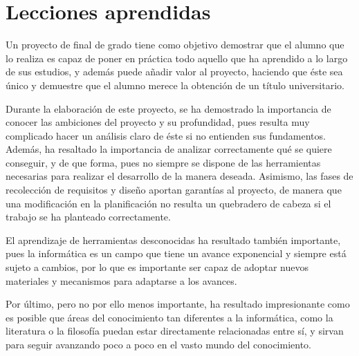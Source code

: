 
\section{Lecciones aprendidas}
Un proyecto de final de grado tiene como objetivo demostrar que el alumno que lo realiza es capaz de poner en práctica 
todo aquello que ha aprendido a lo largo de sus estudios, y además puede añadir valor al proyecto, haciendo que éste 
sea único y demuestre que el alumno merece la obtención de un título universitario. \medskip

Durante la elaboración de este proyecto, se ha demostrado la importancia de conocer las ambiciones del proyecto y 
su profundidad, pues resulta muy complicado hacer un análisis claro de éste si no entienden sus fundamentos. 
Además, ha resaltado la importancia de analizar correctamente qué se quiere conseguir, y de que forma, pues 
no siempre se dispone de las herramientas necesarias para realizar el desarrollo de la manera deseada. Asimismo, 
las fases de recolección de requisitos y diseño aportan garantías al proyecto, de manera que una modificación en 
la planificación no resulta un quebradero de cabeza si el trabajo se ha planteado correctamente. \medskip

El aprendizaje de herramientas desconocidas ha resultado también importante, pues la informática es un campo 
que tiene un avance exponencial y siempre está sujeto a cambios, por lo que es importante ser capaz de 
adoptar nuevos materiales y mecanismos para adaptarse a los avances.\medskip

Por último, pero no por ello menos importante, ha resultado impresionante como es posible que áreas del conocimiento 
tan diferentes a la informática, como la literatura o la filosofía puedan estar directamente relacionadas entre sí, 
y sirvan para seguir avanzando poco a poco en el vasto mundo del conocimiento.